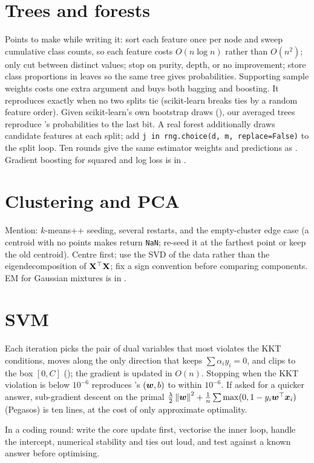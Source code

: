 \section{Trees and forests}
Points to make while writing it: sort each feature once per node and sweep cumulative class counts, so each feature
costs $O(n\log n)$ rather than $O(n^2)$; only cut between distinct values; stop on purity, depth, or no
improvement; store class proportions in leaves so the same tree gives probabilities. Supporting sample weights costs
one extra argument and buys both bagging and boosting. It reproduces  exactly when no
two splits tie (scikit-learn breaks ties by a random feature order).
Given scikit-learn's own bootstrap draws (), our averaged trees reproduce
's probabilities to the last bit. A real forest additionally draws
 candidate features at each split; add \texttt{j in rng.choice(d, m, replace=False)} to the split
loop.
Ten rounds give the same estimator weights and predictions as . Gradient boosting for squared
and log loss is in .

\section{Clustering and PCA}
Mention: $k$-means++ seeding, several restarts, and the empty-cluster edge case (a centroid with no points makes
 return \texttt{NaN}; re-seed it at the farthest point or keep the old centroid).
Centre first; use the SVD of the data rather than the eigendecomposition of ${\mathbf{X}}^{\top}{\mathbf{X}}$; fix a sign convention before
comparing components. EM for Gaussian mixtures is in .

\section{SVM}
Each iteration picks the pair of dual variables that most violates the KKT conditions, moves along the only direction
that keeps $\sum\alpha_iy_i=0$, and clips to the box $[0,C]$ (); the gradient is updated in $O(n)$.
Stopping when the KKT violation is below $10^{-6}$ reproduces 's $({\bm{w}},b)$ to within
$10^{-6}$. If asked for a quicker answer, sub-gradient descent on the primal
$\frac\lambda2\left\lVert {\bm{w}} \right\rVert^2+\frac1n\sum\max(0,1-y_i{\bm{w}}^{\top}{\bm{x}}_i)$ (Pegasos) is ten lines, at the cost of only approximate
optimality.

\begin{moral}
	In a coding round: write the core update first, vectorise the inner loop, handle the intercept, numerical stability
	and ties out loud, and test against a known answer before optimising.
\end{moral}
